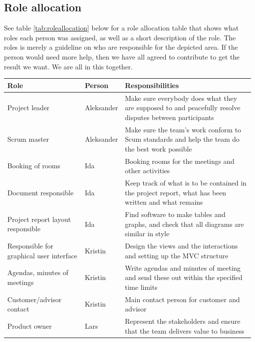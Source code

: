 \subsection{Role allocation}
See table \ref{tab:roleallocation} below for a role allocation table that shows what roles each person was assigned, as well as a short description of the role. The roles is merely a guideline on who are responsible for the depicted area. If the person would need more help, then we have all agreed to contribute to get the result we want. We are all in this together.
\begin{table}[h!]
\begin{center}
\begin{tabularx}{\linewidth}{>{\setlength\hsize{.5\hsize}}X|>{\setlength\hsize{0.3\hsize}}X|>{\setlength\hsize{1\hsize}}X} \hline
\textbf{Role} & \textbf{Person} & \textbf{Responsibilities} \\ \hline \hline

Project leader & Aleksander & Make sure everybody does what they are supposed to and peacefully resolve disputes between participants \\  \hline
Scrum master & Aleksander & Make sure the team’s work conform to Scum standards and help the team do the best work possible \\ \hline

Booking of rooms & Ida & Booking rooms for the meetings and other activities \\ \hline
Document responsible & Ida &Keep track of what is to be contained in the project report, what has been written and what remains \\ \hline
Project report layout responsible & Ida &Find software to make tables and graphs, and check that all diagrams are similar in style \\ \hline

Responsible for graphical user interface & Kristin & Design the views and the interactions and setting up the MVC structure \\ \hline
Agendas, minutes of meetings & Kristin &Write agendas and minutes of meeting and send these out within the specified time limits \\ \hline
Customer/advisor contact & Kristin & Main contact person for customer and advisor \\ \hline

Product owner & Lars & Represent the stakeholders and ensure that the team delivers value to business\\ \hline


\end{tabularx}
\end{center}
\end{table}
